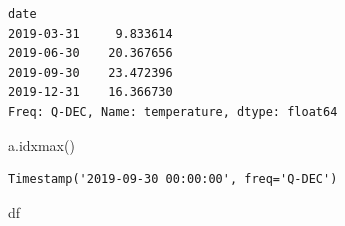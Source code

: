 \documentclass[
  letterpaper,
  DIV=11,
  numbers=noendperiod,
  oneside]{scrreprt}
\newenvironment{Shaded}{\begin{snugshade}}{\end{snugshade}}
\newcommand{\NormalTok}[1]{\textcolor[rgb]{0.00,0.23,0.31}{#1}}
\begin{document}
\begin{verbatim}
date
2019-03-31     9.833614
2019-06-30    20.367656
2019-09-30    23.472396
2019-12-31    16.366730
Freq: Q-DEC, Name: temperature, dtype: float64
\end{verbatim}

\begin{Shaded}
\begin{Highlighting}[]
\NormalTok{a.idxmax()}
\end{Highlighting}
\end{Shaded}

\begin{verbatim}
Timestamp('2019-09-30 00:00:00', freq='Q-DEC')
\end{verbatim}

\begin{Shaded}
\begin{Highlighting}[]
\NormalTok{df}
\end{Highlighting}
\end{Shaded}
\end{document}
